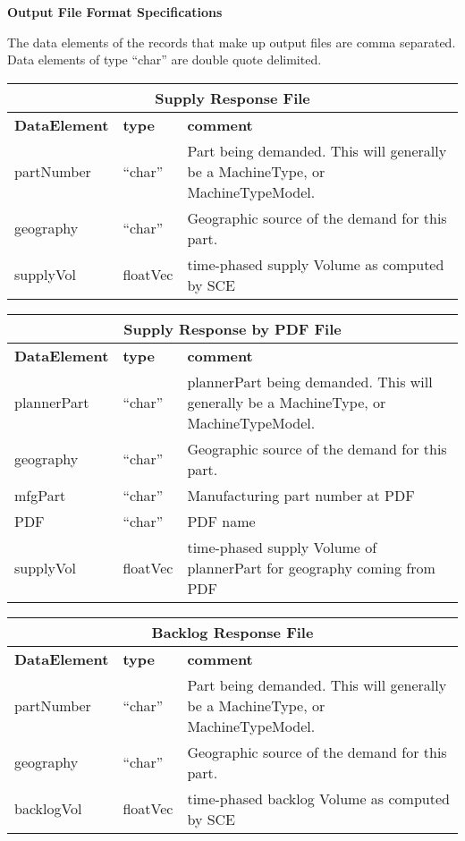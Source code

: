 \clearpage
\noindent
{\bf Output File Format Specifications}

The data elements of the records that make up output files are comma 
separated.  Data elements of type ``char'' are double quote delimited. 

\begin{tabular}{llp{4in}}
\multicolumn{3}{c}{{\bf Supply Response File}}\\ \hline\hline
{\bf DataElement} &  {\bf type}  &   {\bf comment} \\ \hline
partNumber  & ``char'' &     Part being demanded.  This will generally be a
                       MachineType, or MachineTypeModel. \\
geography   & ``char''  &    Geographic source of the demand for this part. \\
supplyVol   & floatVec&  time-phased supply Volume as computed by SCE \\
\end{tabular}

\vspace{.5in}

\begin{tabular}{llp{4in}}
\multicolumn{3}{c}{{\bf Supply Response by PDF File}}\\ \hline\hline
{\bf DataElement} &  {\bf type}  &   {\bf comment} \\ \hline
plannerPart  & ``char'' &     plannerPart being demanded.  
           This will generally be a
                       MachineType, or MachineTypeModel. \\
geography   & ``char''  &    Geographic source of the demand for this part. \\
mfgPart     & ``char''  & Manufacturing part number at PDF \\
PDF         & ``char''  & PDF name \\
supplyVol   & floatVec&  time-phased supply Volume of plannerPart for 
    geography coming from PDF  
\end{tabular}


\vspace{.5in}

\begin{tabular}{llp{4in}}
\multicolumn{3}{c}{{\bf Backlog Response File}}\\ \hline\hline
{\bf DataElement} &  {\bf type}  &   {\bf comment} \\ \hline
partNumber  & ``char'' &     Part being demanded.  This will generally be a
                       MachineType, or MachineTypeModel. \\
geography   & ``char''  &    Geographic source of the demand for this part. \\
backlogVol   & floatVec&  time-phased backlog Volume as computed by SCE \\
\end{tabular}

